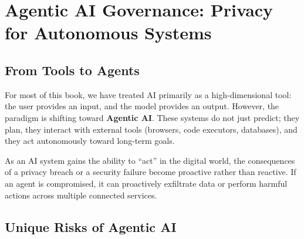 
\chapter{Agentic AI Governance: Privacy for Autonomous Systems}
\label{chap:agentic_governance}


\section{From Tools to Agents}
\label{sec:tools_to_agents_ch21}

For most of this book, we have treated AI primarily as a high-dimensional tool: the user provides an input, and the model provides an output. However, the paradigm is shifting toward \textbf{Agentic AI}. These systems do not just predict; they plan, they interact with external tools (browsers, code executors, databases), and they act autonomously toward long-term goals.

As an AI system gains the ability to ``act'' in the digital world, the consequences of a privacy breach or a security failure become proactive rather than reactive. If an agent is compromised, it can proactively exfiltrate data or perform harmful actions across multiple connected services.

\section{Unique Risks of Agentic AI}
\label{sec:agentic_risks_ch21}

